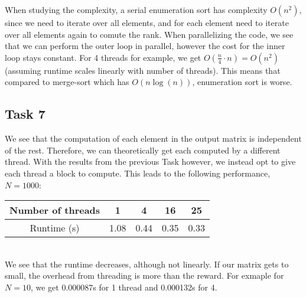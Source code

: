 \documentclass[a4paper]{scrartcl}
\begin{document}
        When studying the complexity, a serial enumeration sort has complexity
        $O(n^2)$, since we need to iterate over all elements, and for each
        element need to iterate over all elements again to comute the rank. When
        parallelizing the code, we see that we can perform the outer loop in
        parallel, however the cost for the inner loop stays constant. For 4
        threads for example, we get $O(\frac{n}{4}\cdot n) = O(n^2)$ (assuming
        runtime scales linearly with number of threads). This means that
        compared to merge-sort which has $O(n\log(n))$, enumeration sort is
        worse.

    \subsection{Task 7}
        We see that the computation of each element in the output matrix is
        independent of the rest. Therefore, we can theoretically get each
        computed by a different thread. With the results from the previous Task
        however, we instead opt to give each thread a block to compute. This
        leads to the following performance, $N=1000$:\\[10pt]
        \noindent\begin{tabular}{c|c|c|c|c}
            Number of threads & 1 & 4 & 16 & 25\\
            \hline
            Runtime (s) & 1.08 & 0.44 & 0.35 & 0.33
        \end{tabular}\\[10pt]
        We see that the runtime decreases, although not linearly. If our matrix
        gets to small, the overhead from threading is more than the reward. For
        exmaple for $N=10$, we get 0.000087s for 1 thread and 0.000132s for 4.
        
            
        
    
\end{document}
